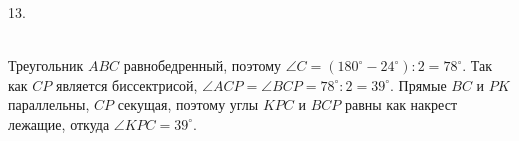 13. \begin{figure}[ht!]
\end{figure}\\
Треугольник $ABC$ равнобедренный, поэтому $\angle C=(180^\circ-24^\circ):2=78^\circ.$ Так как $CP$ является биссектрисой, $\angle ACP=\angle BCP=78^\circ:2=39^\circ.$ Прямые $BC$ и $PK$ параллельны, $CP$ секущая, поэтому углы $KPC$ и $BCP$ равны как накрест лежащие, откуда $\angle KPC=39^\circ.$\\
